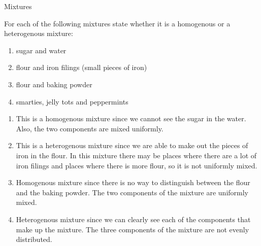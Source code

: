       \begin{wex}{Mixtures}
{For each of the following mixtures state whether it is a homogenous or a heterogenous mixture:
\label{m38708*eip-id1167649056231}\begin{enumerate}[noitemsep, label=\textbf{\alph*}. ] 
            \leftskip=20pt\rightskip=\leftskip\item sugar and water
\item flour and iron filings (small pieces of iron)
\item flour and baking powder\item smarties, jelly tots and peppermints\end{enumerate} }
{
\begin{enumerate}[noitemsep, label=\textbf{\alph*}. ] 
\item This is a homogenous mixture since we cannot see the sugar in the water. Also, the two components are mixed uniformly.
\item This is a heterogenous mixture since we are able to make out the pieces of iron in the flour. In this mixture there may be places where there are a lot of iron filings and places where there is more flour, so it is not uniformly mixed.
\item Homogenous mixture since there is no way to distinguish between the flour and the baking powder. The two components of the mixture are uniformly mixed.
\item Heterogenous mixture since we can clearly see each of the components that make up the mixture. The three components of the mixture are not evenly distributed.\end{enumerate}}
    \end{wex}
 
